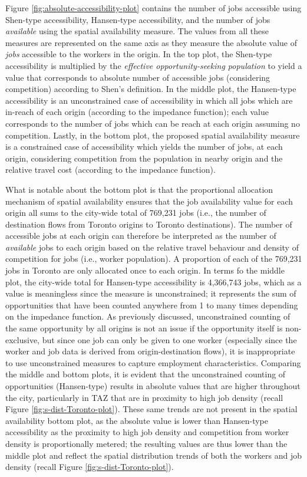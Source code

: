 \documentclass[10pt,letterpaper]{article}
\begin{document}
Figure \ref{fig:absolute-accessibility-plot} contains the number of jobs
accessible using Shen-type accessibility, Hansen-type accessibility, and
the number of jobs \emph{available} using the spatial availability
measure. The values from all these measures are represented on the same
axis as they measure the absolute value of \emph{jobs} accessible to the
workers in the origin. In the top plot, the Shen-type accessibility is
multiplied by the \emph{effective opportunity-seeking population} to
yield a value that corresponds to absolute number of accessible jobs
(considering competition) according to Shen's definition. In the middle
plot, the Hansen-type accessibility is an unconstrained case of
accessibility in which all jobs which are in-reach of each origin
(according to the impedance function); each value corresponds to the
number of jobs which can be reach at each origin assuming no
competition. Lastly, in the bottom plot, the proposed spatial
availability measure is a constrained case of accessibility which yields
the number of jobs, at each origin, considering competition from the
population in nearby origin and the relative travel cost (according to
the impedance function).

What is notable about the bottom plot is that the proportional
allocation mechanism of spatial availability ensures that the job
availability value for each origin all sums to the city-wide total of
769,231 jobs (i.e., the number of destination flows from Toronto origins
to Toronto destinations). The number of accessible jobs at each origin
can therefore be interpreted as the number of \emph{available} jobs to
each origin based on the relative travel behaviour and density of
competition for jobs (i.e., worker population). A proportion of each of
the 769,231 jobs in Toronto are only allocated once to each origin. In
terms fo the middle plot, the city-wide total for Hansen-type
accessibility is 4,366,743 jobs, which as a value is meaningless since
the measure is unconstrained; it represents the sum of opportunities
that have been counted anywhere from 1 to many times depending on the
impedance function. As previously discussed, unconstrained counting of
the same opportunity by all origins is not an issue if the opportunity
itself is non-exclusive, but since one job can only be given to one
worker (especially since the worker and job data is derived from
origin-destination flows), it is inappropriate to use unconstrained
measures to capture employment characteristics. Comparing the middle and
bottom plots, it is evident that the unconstrained counting of
opportunities (Hansen-type) results in absolute values that are higher
throughout the city, particularly in TAZ that are in proximity to high
job density (recall Figure \ref{fig:s-dist-Toronto-plot}). These same
trends are not present in the spatial availability bottom plot, as the
absolute value is lower than Hansen-type accessibility as the proximity
to high job density and competition from worker density is
proportionally metered; the resulting values are thus lower than the
middle plot and reflect the spatial distribution trends of both the
workers and job density (recall Figure \ref{fig:s-dist-Toronto-plot}).
\end{document}
